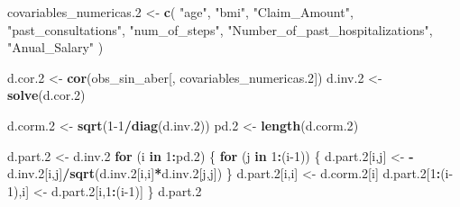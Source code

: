\documentclass[
]{article}
\newenvironment{Shaded}{\begin{snugshade}}{\end{snugshade}}
\newcommand{\ControlFlowTok}[1]{\textcolor[rgb]{0.13,0.29,0.53}{\textbf{#1}}}
\newcommand{\DecValTok}[1]{\textcolor[rgb]{0.00,0.00,0.81}{#1}}
\newcommand{\FloatTok}[1]{\textcolor[rgb]{0.00,0.00,0.81}{#1}}
\newcommand{\FunctionTok}[1]{\textcolor[rgb]{0.13,0.29,0.53}{\textbf{#1}}}
\newcommand{\NormalTok}[1]{#1}
\newcommand{\OtherTok}[1]{\textcolor[rgb]{0.56,0.35,0.01}{#1}}
\newcommand{\SpecialCharTok}[1]{\textcolor[rgb]{0.81,0.36,0.00}{\textbf{#1}}}
\newcommand{\StringTok}[1]{\textcolor[rgb]{0.31,0.60,0.02}{#1}}
\begin{document}
\begin{Shaded}
\begin{Highlighting}[]
\NormalTok{covariables\_numericas}\FloatTok{.2} \OtherTok{\textless{}{-}} \FunctionTok{c}\NormalTok{(}
  \StringTok{"age"}\NormalTok{,}
  \StringTok{"bmi"}\NormalTok{,}
  \StringTok{"Claim\_Amount"}\NormalTok{,}
  \StringTok{"past\_consultations"}\NormalTok{,}
  \StringTok{"num\_of\_steps"}\NormalTok{,}
  \StringTok{"Number\_of\_past\_hospitalizations"}\NormalTok{,}
  \StringTok{"Anual\_Salary"}
\NormalTok{)}

\NormalTok{d.cor}\FloatTok{.2} \OtherTok{\textless{}{-}} \FunctionTok{cor}\NormalTok{(obs\_sin\_aber[, covariables\_numericas}\FloatTok{.2}\NormalTok{])}
\NormalTok{d.inv}\FloatTok{.2} \OtherTok{\textless{}{-}} \FunctionTok{solve}\NormalTok{(d.cor}\FloatTok{.2}\NormalTok{)}

\NormalTok{d.corm}\FloatTok{.2} \OtherTok{\textless{}{-}} \FunctionTok{sqrt}\NormalTok{(}\DecValTok{1{-}1}\SpecialCharTok{/}\FunctionTok{diag}\NormalTok{(d.inv}\FloatTok{.2}\NormalTok{))}
\NormalTok{pd}\FloatTok{.2} \OtherTok{\textless{}{-}} \FunctionTok{length}\NormalTok{(d.corm}\FloatTok{.2}\NormalTok{)  }


\NormalTok{d.part}\FloatTok{.2} \OtherTok{\textless{}{-}}\NormalTok{ d.inv}\FloatTok{.2}
\ControlFlowTok{for}\NormalTok{ (i }\ControlFlowTok{in} \DecValTok{1}\SpecialCharTok{:}\NormalTok{pd}\FloatTok{.2}\NormalTok{) \{}
  \ControlFlowTok{for}\NormalTok{ (j }\ControlFlowTok{in} \DecValTok{1}\SpecialCharTok{:}\NormalTok{(i}\DecValTok{{-}1}\NormalTok{)) \{}
\NormalTok{    d.part}\FloatTok{.2}\NormalTok{[i,j] }\OtherTok{\textless{}{-}} \SpecialCharTok{{-}}\NormalTok{d.inv}\FloatTok{.2}\NormalTok{[i,j]}\SpecialCharTok{/}\FunctionTok{sqrt}\NormalTok{(d.inv}\FloatTok{.2}\NormalTok{[i,i]}\SpecialCharTok{*}\NormalTok{d.inv}\FloatTok{.2}\NormalTok{[j,j])}
\NormalTok{  \}}
\NormalTok{  d.part}\FloatTok{.2}\NormalTok{[i,i] }\OtherTok{\textless{}{-}}\NormalTok{ d.corm}\FloatTok{.2}\NormalTok{[i]}
\NormalTok{  d.part}\FloatTok{.2}\NormalTok{[}\DecValTok{1}\SpecialCharTok{:}\NormalTok{(i}\DecValTok{{-}1}\NormalTok{),i] }\OtherTok{\textless{}{-}}\NormalTok{ d.part}\FloatTok{.2}\NormalTok{[i,}\DecValTok{1}\SpecialCharTok{:}\NormalTok{(i}\DecValTok{{-}1}\NormalTok{)]  }
\NormalTok{\}}
\NormalTok{d.part}\FloatTok{.2}
\end{Highlighting}
\end{Shaded}
\end{document}
